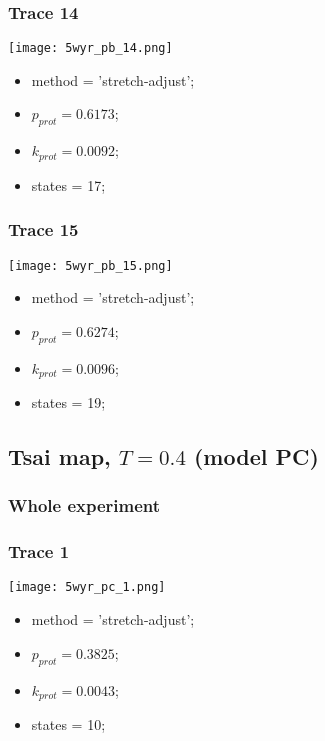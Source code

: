 \subsubsection{Trace 14}
\begin{minipage}[c]{0.7\textwidth}
    \texttt{[image: 5wyr\_pb\_14.png]}
\end{minipage}
\hfill
\begin{minipage}[c]{0.45\textwidth}
    \begin{itemize}
        \item method = 'stretch-adjust';
        \item $p_{prot}=0.6173$;
        \item $k_{prot}=0.0092$;
        \item states = 17;
    \end{itemize}
\end{minipage}

\subsubsection{Trace 15}
\begin{minipage}[c]{0.7\textwidth}
    \texttt{[image: 5wyr\_pb\_15.png]}
\end{minipage}
\hfill
\begin{minipage}[c]{0.45\textwidth}
    \begin{itemize}
        \item method = 'stretch-adjust';
        \item $p_{prot}=0.6274$;
        \item $k_{prot}=0.0096$;
        \item states = 19;
    \end{itemize}
\end{minipage}

\subsection{Tsai map, $T=0.4$ (model PC)}
\subsubsection{Whole experiment}

\subsubsection{Trace 1}
\begin{minipage}[c]{0.7\textwidth}
    \texttt{[image: 5wyr\_pc\_1.png]}
\end{minipage}
\hfill
\begin{minipage}[c]{0.45\textwidth}
    \begin{itemize}
        \item method = 'stretch-adjust';
        \item $p_{prot}=0.3825$;
        \item $k_{prot}=0.0043$;
        \item states = 10;
    \end{itemize}
\end{minipage}

